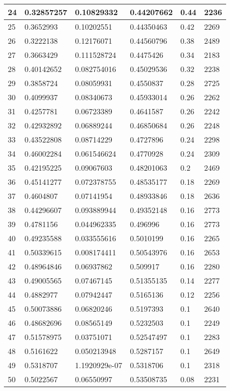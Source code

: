 \begin{longtable}{|l|l|l|l|l|l|}
24 & 0.32857257 & 0.10829332 & 0.44207662 & 0.44 & 2236 \\ \hline 
25 & 0.3652993 & 0.10202551 & 0.44350463 & 0.42 & 2269 \\ \hline 
26 & 0.3222138 & 0.12176071 & 0.44560796 & 0.38 & 2489 \\ \hline 
27 & 0.3663429 & 0.111528724 & 0.4475426 & 0.34 & 2183 \\ \hline 
28 & 0.40142652 & 0.082754016 & 0.45029536 & 0.32 & 2238 \\ \hline 
29 & 0.3858724 & 0.08059931 & 0.4550837 & 0.28 & 2725 \\ \hline 
30 & 0.4099937 & 0.08340673 & 0.45933014 & 0.26 & 2262 \\ \hline 
31 & 0.4257781 & 0.06723389 & 0.4641587 & 0.26 & 2242 \\ \hline 
32 & 0.42932892 & 0.06889244 & 0.46850684 & 0.26 & 2248 \\ \hline 
33 & 0.43522808 & 0.08714229 & 0.4727896 & 0.24 & 2298 \\ \hline 
34 & 0.46002284 & 0.061546624 & 0.4770928 & 0.24 & 2309 \\ \hline 
35 & 0.42195225 & 0.09067603 & 0.48201063 & 0.2 & 2469 \\ \hline 
36 & 0.45141277 & 0.072378755 & 0.48535177 & 0.18 & 2269 \\ \hline 
37 & 0.4604807 & 0.07141954 & 0.48933846 & 0.18 & 2636 \\ \hline 
38 & 0.44296607 & 0.093889944 & 0.49352148 & 0.16 & 2773 \\ \hline 
39 & 0.4781156 & 0.044962335 & 0.496996 & 0.16 & 2773 \\ \hline 
40 & 0.49235588 & 0.033555616 & 0.5010199 & 0.16 & 2265 \\ \hline 
41 & 0.50339615 & 0.008174411 & 0.50543976 & 0.16 & 2653 \\ \hline 
42 & 0.48964846 & 0.06937862 & 0.509917 & 0.16 & 2280 \\ \hline 
43 & 0.49005565 & 0.07467145 & 0.51355135 & 0.14 & 2277 \\ \hline 
44 & 0.4882977 & 0.07942447 & 0.5165136 & 0.12 & 2256 \\ \hline 
45 & 0.50073886 & 0.06820246 & 0.5197393 & 0.1 & 2640 \\ \hline 
46 & 0.48682696 & 0.08565149 & 0.5232503 & 0.1 & 2249 \\ \hline 
47 & 0.51578975 & 0.03751071 & 0.52547497 & 0.1 & 2283 \\ \hline 
48 & 0.5161622 & 0.050213948 & 0.5287157 & 0.1 & 2649 \\ \hline 
49 & 0.5318707 & 1.1920929e-07 & 0.5318706 & 0.1 & 2318 \\ \hline 
50 & 0.5022567 & 0.06550997 & 0.53508735 & 0.08 & 2231 \\ \hline 
\end{longtable}